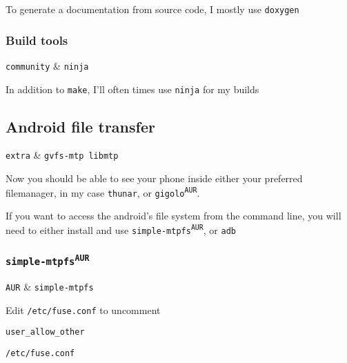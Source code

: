 \documentclass[10pt]{dustdoc}
\begin{document}
To generate a documentation from source code, I mostly use \texttt{doxygen}

\subsubsection{Build tools}
\label{sec:build-tools}

\begin{packagetable}
    \texttt{community} & \texttt{ninja} \\
\end{packagetable}

In addition to \texttt{make}, I’ll often times use \texttt{ninja} for my builds

\subsection{Android file transfer}
\label{sec:android-file-transfer}

\begin{packagetable}
    \texttt{extra} & \texttt{gvfs-mtp libmtp} \\
\end{packagetable}

Now you should be able to see your phone inside either your preferred filemanager, in my case \texttt{thunar}, or \texttt{gigolo\textsuperscript{\texttt{AUR}}}.

If you want to access the android’s file system from the command line, you will need to either install and use \texttt{simple-mtpfs\textsuperscript{\texttt{AUR}}}, or \texttt{adb}

\subsubsection{\texttt{simple-mtpfs\texorpdfstring{\textsuperscript{AUR}}{ (AUR)}}}
\label{sec:simple-mtpfs-aur}

\begin{packagetable}
    \texttt{AUR} & \texttt{simple-mtpfs} \\
\end{packagetable}

Edit \texttt{/etc/fuse.conf} to uncomment

\begin{mintedlisting}
    \begin{verbatim}
user_allow_other
    \end{verbatim}

    \caption{\texttt{/etc/fuse.conf}}
\end{mintedlisting}
\end{document}
